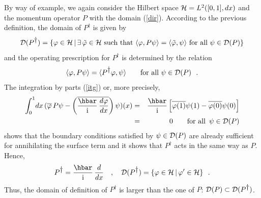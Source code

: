 \documentclass[12pt]{report}
\begin{document}
By way of example, we again consider the Hilbert space 
$\hs =  L^2 ([0,1], dx)$
and the momentum operator 
$P$ with the domain (\ref{dir}). According to the previous definition, 
the domain of $P^{\dag}$ is given by 
\[
{\cal D} (P^{\dag}) = \{ \varphi \in \hs \, | \, \exists\,
\tilde{\varphi} \in \hs \ \mbox{such that} \
\langle \varphi , P \psi \rangle =
\langle \tilde \varphi , \psi \rangle
\ \mbox{for all} \ \psi  \in {\cal D} (P) \}
\]
and the operating prescription for $P^{\dag}$ is determined  
by the relation 
\begin{equation}
\langle \varphi , P \psi \rangle =
\langle P^{\dag} \varphi , \psi \rangle
\qquad \mbox{for all} \ \psi \in {\cal D}(P)
\ \ .
\end{equation}
The integration by parts (\ref{itg})
or, more precisely, 
\begin{eqnarray}
\int_0^1 \! d x \, (  \overline{\varphi} \, P\psi
-
\left( \overline{\ds{\hbar \over \ri} \,
\ds{d\varphi \over dx} }  \right) \psi ) ( x )
&=& \ds{\hbar \over \ri} \left[ \overline{\varphi( 1)} \psi (1) -
\overline{ \varphi ( 0)} \psi (0) \right] 
\nonumber 
\\
& =& 0
\qquad  \mbox{for all} \ \, \psi \in {\cal D}( P)
\nonumber 
\end{eqnarray} 
shows that the boundary conditions satisfied by 
$\psi \in {\cal D}(P)$ are already sufficient 
for annihilating the surface term
and it shows that $P^{\dag}$ acts in the same way as  $P$. 
Hence, 
\begin{equation}
\label{dadj}
P^{\dag}  = \ds{\hbar \over \ri} \, \ds{d \over dx}
\quad , \quad
{\cal D} (P^{\dag}) = \{ \varphi \in \hs \, | \, \varphi^{\prime}
\in \hs \}
\ \ .
\end{equation}
Thus, the domain of definition of $P^{\dag}$ is larger 
than the one of $P$:
${\cal D}(P) \subset {\cal D}(P^{\dag})$.
 
\bigskip 
\end{document}
